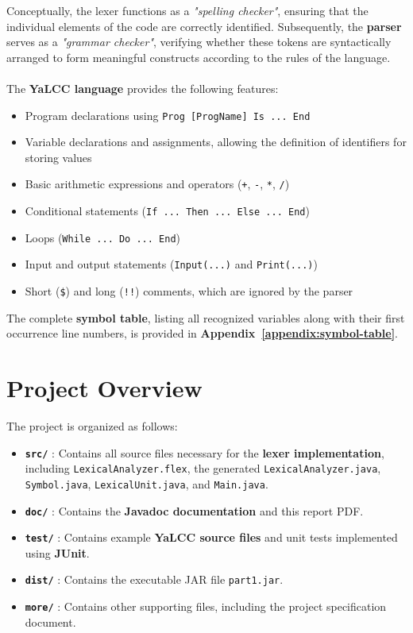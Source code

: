 \documentclass{article}
\begin{document}
\noindent Conceptually, the lexer functions as a \textit{"spelling checker"}, ensuring that the individual elements of the code are correctly identified. Subsequently, the \textbf{parser} serves as a \textit{"grammar checker"}, verifying whether these tokens are syntactically arranged to form meaningful constructs according to the rules of the language. \\ \\

\noindent The \textbf{YaLCC language} provides the following features:
\begin{itemize}
    \item Program declarations using \texttt{Prog [ProgName] Is ... End}
    \item Variable declarations and assignments, allowing the definition of identifiers for storing values
    \item Basic arithmetic expressions and operators (\texttt{+}, \texttt{-}, \texttt{*}, \texttt{/})
    \item Conditional statements (\texttt{If ... Then ... Else ... End})
    \item Loops (\texttt{While ... Do ... End})
    \item Input and output statements (\texttt{Input(...)} and \texttt{Print(...)})
    \item Short (\texttt{\$}) and long (\texttt{!!}) comments, which are ignored by the parser \\
\end{itemize}

\noindent The complete \textbf{symbol table}, listing all recognized variables along with their first occurrence line numbers, is provided in \textbf{Appendix~\ref{appendix:symbol-table}}.


\section{Project Overview}

\noindent The project is organized as follows:

\begin{itemize}
    \item \textbf{\texttt{src/}} : Contains all source files necessary for the \textbf{lexer implementation}, including \texttt{LexicalAnalyzer.flex}, the generated \texttt{LexicalAnalyzer.java}, \texttt{Symbol.java}, \texttt{LexicalUnit.java}, and \texttt{Main.java}.
    \item \textbf{\texttt{doc/}} : Contains the \textbf{Javadoc documentation} and this report PDF.
    \item \textbf{\texttt{test/}} : Contains example \textbf{YaLCC source files} and unit tests implemented using \textbf{JUnit}.
    \item \textbf{\texttt{dist/}} : Contains the executable JAR file \texttt{part1.jar}.
    \item \textbf{\texttt{more/}} : Contains other supporting files, including the project specification document.
\end{itemize}
\end{document}
